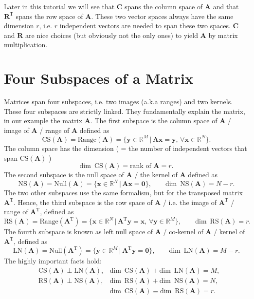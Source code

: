 \documentclass[a4paper, 11pt]{scrartcl}
\begin{document}
Later in this tutorial we will see that $\bm{C}$ spans the column space of $\bm{A}$ and that $\bm{R}^\mathrm{T}$ spans the row space of $\bm{A}$.
These two vector spaces always have the same dimension $r$, i.e. $r$ independent vectors are needed to span these two spaces.
$\bm{C}$ and $\bm{R}$ are nice choices (but obviously not the only ones) to yield $\bm{A}$ by matrix multiplication.

\section{Four Subspaces of a Matrix}
Matrices span four subspaces, i.e. two images (a.k.a ranges) and two kernels.
These four subspaces are strictly linked. They fundamentally explain the matrix, in our example the matrix $\bm{A}$.
%
The first subspace is the column space of $\bm{A}$ / image of $\bm{A}$ / range of $\bm{A}$ defined as
$$
\text{CS}(\bm{A}) = \text{Range}(\bm{A}) = \{\bm{y} \in \mathbb{R}^M \, | \, \bm{A}\bm{x}=\bm{y},\, \forall \bm{x}\in\mathbb{R}^N\}.
$$
The column space has the dimension ( = the number of independent vectors that span $\text{CS}(\bm{A})$ )
$$
\text{dim}\,\,\, \text{CS}(\bm{A}) = \text{rank of }\bm{A} = r.
$$
The second subspace is the null space of $\bm{A}$ / the kernel of $\bm{A}$ defined as
$$
\text{NS}(\bm{A}) = \text{Null}(\bm{A}) = \{\bm{x} \in \mathbb{R}^N \, | \, \bm{A}\bm{x}=\bm{0}\}, \qquad
\text{dim}\,\,\, \text{NS}(\bm{A}) = N-r.
$$
The two other subspaces use the same formalism, but for the transposed matrix $\bm{A}^\mathrm{T}$.
Hence, the third subspace is the row space of $\bm{A}$ / i.e. the image of $\bm{A}^\mathrm{T}$ / range of $\bm{A}^\mathrm{T}$, defined as
$$
\text{RS}(\bm{A})= \text{Range}(\bm{A}^\mathrm{T}) = \{\bm{x} \in \mathbb{R}^N \, | \, \bm{A}^\mathrm{T}\bm{y}=\bm{x},\, \forall \bm{y}\in\mathbb{R}^M\},\qquad \text{dim}\,\,\, \text{RS}(\bm{A}) = r.
$$
The fourth subspace is known as left null space of $\bm{A}$ / co-kernel of $\bm{A}$ / kernel of $\bm{A}^\mathrm{T}$, defined as
$$
\text{LN}(\bm{A}) = \text{Null}(\bm{A}^\mathrm{T}) = \{\bm{y} \in \mathbb{R}^M \, | \, \bm{A}^\mathrm{T}\bm{y}=\bm{0}\},\qquad
\text{dim}\,\,\, \text{LN}(\bm{A}) = M-r.
$$
The highly important facts hold:
\begin{align*}
&\text{CS}(\bm{A}) \perp \text{LN}(\bm{A}),
&\text{dim}\,\,\, \text{CS}(\bm{A}) + \text{dim}\,\,\, \text{LN}(\bm{A}) = M,\\
&\text{RS}(\bm{A}) \perp
\text{NS}(\bm{A}),
&\text{dim}\,\,\, \text{RS}(\bm{A}) + \text{dim}\,\,\, \text{NS}(\bm{A}) = N,\\
&&\text{dim}\,\,\, \text{CS}(\bm{A}) \equiv \text{dim}\,\,\, \text{RS}(\bm{A}) = r.
\end{align*}
\end{document}
